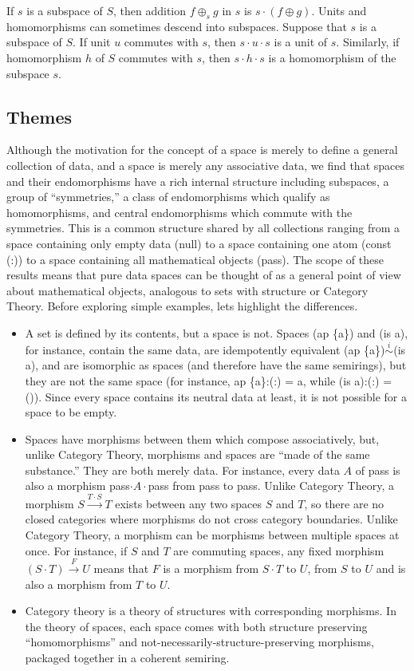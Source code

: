 \documentclass[11pt]{article}
\begin{document}
     If $s$ is a subspace of $S$, then addition $f\oplus_s g$ in $s$ is $s\cdot(f\oplus g)$.  
Units and homomorphisms can sometimes descend into subspaces.  Suppose that $s$ is a subspace of $S$.  
If unit $u$ commutes with $s$, then $s\cdot u\cdot s$ is a unit of $s$.  Similarly, if homomorphism $h$ of $S$ commutes with $s$, then $s\cdot h\cdot s$ is 
a homomorphism of the subspace $s$.

\subsection{Themes}

Although the motivation for the concept of a space is merely to define a general collection of data, and a space is merely any associative data, we 
find that spaces and their endomorphisms have a rich internal structure including subspaces, a group of ``symmetries,'' a class of endomorphisms which 
qualify as homomorphisms, and central endomorphisms which commute with the symmetries.  This is a common structure shared by all collections ranging 
from a space containing only empty data (null) to a space containing one atom (const (:)) to a space containing all mathematical objects (pass).  
The scope of these results means that pure data spaces can be thought of as a general point of view about mathematical objects, analogous to
sets with structure or Category Theory.  Before exploring simple examples, lets highlight the differences. 
\begin{itemize}
\item{A set is defined by its contents, but a space is not.  Spaces (ap \{a\}) and (is a), for instance, contain the 
same data, are idempotently equivalent (ap \{a\})${\overset i\sim}$(is a), and are isomorphic as spaces (and therefore have 
the same semirings), but they are not the same space (for instance, ap \{a\}:(:) = a, while (is a):(:) = ()).  Since every 
space contains its neutral data at least, it is not possible for a space to be empty.}
\item{Spaces have morphisms between them which compose associatively, but, unlike Category Theory, morphisms 
and spaces are ``made of the same substance.'' They are both merely data.  For instance, every data $A$ of pass is also 
a morphism pass$\cdot A\cdot$pass from pass to pass.  Unlike Category Theory, a morphism 
$S{\overset {T\cdot S}\longrightarrow}T$ exists between any two spaces $S$ and $T$, so there are no closed categories 
where morphisms do not cross category boundaries.  Unlike Category Theory, a morphism can be morphisms between 
multiple spaces at once.  For instance, if $S$ and $T$ are commuting spaces, any fixed morphism $(S\cdot T){\overset F\rightarrow} U$ 
means that $F$ is a morphism from $S\cdot T$ to $U$, from $S$ to $U$ and is also a morphism from $T$ to $U$.}
\item{Category theory is a theory of structures with corresponding morphisms.  In the theory of spaces, each space 
comes with both structure preserving ``homomorphisms'' and not-necessarily-structure-preserving morphisms, packaged together 
in a coherent semiring.} 
\end{itemize}
\end{document}
